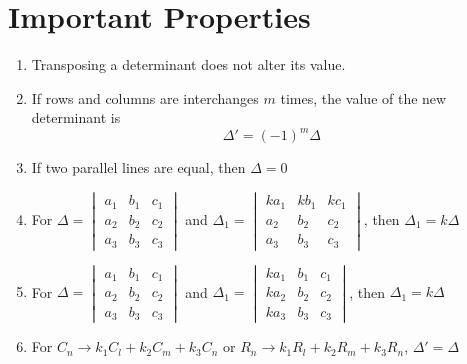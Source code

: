 \section{Important Properties}
\begin{enumerate}
	\item Transposing a determinant does not alter its value.
	\item If rows and columns are interchanges $m$ times, the value of the new determinant is
	\begin{equation}
		\Delta'=(-1)^m \Delta
	\end{equation}
	\item If two parallel lines are equal, then $\Delta=0$
	\item For $\Delta=\begin{vmatrix}a_1&b_1&c_1\\a_2&b_2&c_2\\a_3&b_3&c_3\end{vmatrix}$ and $\Delta_1=\begin{vmatrix}ka_1&kb_1&kc_1\\a_2&b_2&c_2\\a_3&b_3&c_3\end{vmatrix}$, then $\Delta_1=k\Delta$
	\item For $\Delta=\begin{vmatrix}a_1&b_1&c_1\\a_2&b_2&c_2\\a_3&b_3&c_3\end{vmatrix}$ and $\Delta_1=\begin{vmatrix}ka_1&b_1&c_1\\ka_2&b_2&c_2\\ka_3&b_3&c_3\end{vmatrix}$, then $\Delta_1=k\Delta$
	\item For $C_n\rightarrow k_1C_l+k_2C_m+k_3C_n$ or $R_n\rightarrow k_1R_l+k_2R_m+k_3R_n$, $\Delta'=\Delta$
\end{enumerate}


